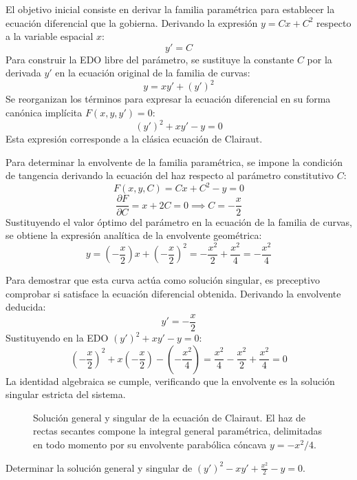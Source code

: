 \begin{tcolorbox}
El objetivo inicial consiste en derivar la familia paramétrica para establecer la ecuación diferencial que la gobierna. Derivando la expresión $y = Cx + C^2$ respecto a la variable espacial $x$:
$$ y' = C $$
Para construir la EDO libre del parámetro, se sustituye la constante $C$ por la derivada $y'$ en la ecuación original de la familia de curvas:
$$ y = x y' + (y')^2 $$
Se reorganizan los términos para expresar la ecuación diferencial en su forma canónica implícita $F(x,y,y') = 0$:
$$ (y')^2 + xy' - y = 0 $$
Esta expresión corresponde a la clásica ecuación de Clairaut.

Para determinar la envolvente de la familia paramétrica, se impone la condición de tangencia derivando la ecuación del haz respecto al parámetro constitutivo $C$:
$$ F(x,y,C) = Cx + C^2 - y = 0 $$
$$ \frac{\partial F}{\partial C} = x + 2C = 0 \implies C = -\frac{x}{2} $$
Sustituyendo el valor óptimo del parámetro en la ecuación de la familia de curvas, se obtiene la expresión analítica de la envolvente geométrica:
$$ y = \left(-\frac{x}{2}\right)x + \left(-\frac{x}{2}\right)^2 = -\frac{x^2}{2} + \frac{x^2}{4} = -\frac{x^2}{4} $$

Para demostrar que esta curva actúa como solución singular, es preceptivo comprobar si satisface la ecuación diferencial obtenida. Derivando la envolvente deducida:
$$ y' = -\frac{x}{2} $$
Sustituyendo en la EDO $(y')^2 + xy' - y = 0$:
$$ \left(-\frac{x}{2}\right)^2 + x\left(-\frac{x}{2}\right) - \left(-\frac{x^2}{4}\right) = \frac{x^2}{4} - \frac{x^2}{2} + \frac{x^2}{4} = 0 $$
La identidad algebraica se cumple, verificando que la envolvente es la solución singular estricta del sistema.

\begin{figure}[H]
    \centering
    
    \caption{Solución general y singular de la ecuación de Clairaut. El haz de rectas secantes compone la integral general paramétrica, delimitadas en todo momento por su envolvente parabólica cóncava $y=-x^2/4$.}
\end{figure}
\end{tcolorbox}

\begin{ejercicio}
Determinar la solución general y singular de $(y')^2 - xy' + \frac{x^2}{2} - y = 0$.
\end{ejercicio}

